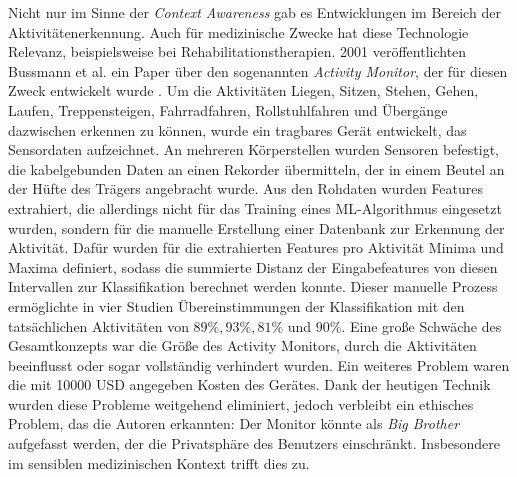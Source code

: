 Nicht nur im Sinne der \textit{Context Awareness} gab es Entwicklungen im Bereich der Aktivitätenerkennung. Auch für medizinische Zwecke hat diese Technologie Relevanz, beispielsweise bei Rehabilitationstherapien. 2001 veröffentlichten Bussmann et al. ein Paper über den sogenannten \textit{Activity Monitor}, der für diesen Zweck entwickelt wurde \cite{Bussmann2001}. Um die Aktivitäten Liegen, Sitzen, Stehen, Gehen, Laufen, Treppensteigen, Fahrradfahren, Rollstuhlfahren und Übergänge dazwischen erkennen zu können, wurde ein tragbares Gerät entwickelt, das Sensordaten aufzeichnet. An mehreren Körperstellen wurden Sensoren befestigt, die kabelgebunden Daten an einen Rekorder übermitteln, der in einem Beutel an der Hüfte des Trägers angebracht wurde. Aus den Rohdaten wurden Features extrahiert, die allerdings nicht für das Training eines ML-Algorithmus eingesetzt wurden, sondern für die manuelle Erstellung einer Datenbank zur Erkennung der Aktivität. Dafür wurden für die extrahierten Features pro Aktivität Minima und Maxima definiert, sodass die summierte Distanz der Eingabefeatures von diesen Intervallen zur Klassifikation berechnet werden konnte. Dieser manuelle Prozess ermöglichte in vier Studien Übereinstimmungen der Klassifikation mit den tatsächlichen Aktivitäten von $89 \%, 93 \%, 81 \%$ und $90 \%$. Eine große Schwäche des Gesamtkonzepts war die Größe des Activity Monitors, durch die Aktivitäten beeinflusst oder sogar vollständig verhindert wurden. Ein weiteres Problem waren die mit 10000 USD angegeben Kosten des Gerätes. Dank der heutigen Technik wurden diese Probleme weitgehend eliminiert, jedoch verbleibt ein ethisches Problem, das die Autoren erkannten: Der Monitor könnte als \textit{Big Brother} aufgefasst werden, der die Privatsphäre des Benutzers einschränkt. Insbesondere im sensiblen medizinischen Kontext trifft dies zu.

